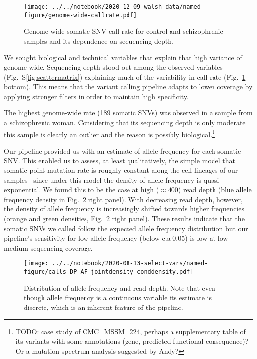\documentclass[letterpaper]{article}
\begin{document}
\begin{figure}
\texttt{[image: ../../notebook/2020-12-09-walsh-data/named-figure/genome-wide-callrate.pdf]}
\caption{
Genome-wide somatic SNV call rate for control and schizophrenic
samples and its dependence on sequencing depth.
}
\label{fig:genomewide-calls}
\end{figure}

We sought biological and technical variables that explain that high variance
of genome-wide.  Sequencing depth stood out among the observed variables
(Fig.~S\ref{fig:scattermatrix}) explaining much of the variability in call
rate (Fig.~\ref{fig:genomewide-calls} bottom). This means that the variant
calling pipeline adapts to lower coverage by applying stronger filters in
order to maintain high specificity.

The highest genome-wide rate (189 somatic SNVs) was observed in a sample from
a schizophrenic woman.  Considering that its sequencing depth is only moderate
this sample is clearly an outlier and the reason is possibly
biological.\footnote{TODO: case study of CMC\_MSSM\_224, perhaps a
supplementary table of its variants with some annotations (gene, predicted
functional consequence)?  Or a mutation spectrum analysis suggested by Andy?}

Our pipeline provided us with an estimate of allele frequency for each somatic
SNV.  This enabled us to assess, at least qualitatively, the simple model that somatic
point mutation rate is roughly constant along the cell lineages of our
samples~\citep{Rodin2021} since under this model the density of allele
frequency is quasi exponential.  We found this to be the case at high
(\(\approx 400\)) read depth (blue allele frequency density in Fig.~\ref{fig:AF}
right panel).  With decreasing read depth, however, the density of allele
frequency is increasingly shifted towards higher frequencies (orange and green
densities, Fig.~\ref{fig:AF} right panel).  These results indicate that the somatic
SNVs we called follow the expected allele frequency distribution but our
pipeline's sensitivity for low allele frequency (below c.a 0.05) is low at
low-medium sequencing coverage.

\begin{figure}
\texttt{[image: ../../notebook/2020-08-13-select-vars/named-figure/calls-DP-AF-jointdensity-conddensity.pdf]}
\caption{
Distribution of allele frequency and read depth.  Note that even though allele frequency is
a continuous variable its estimate is discrete, which is an inherent feature
of the pipeline.
}
\label{fig:AF}
\end{figure}
\end{document}
